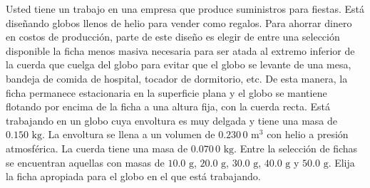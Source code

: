 \item Usted tiene un trabajo en una empresa que produce suministros para fiestas. Está diseñando globos llenos de helio para vender como regalos. Para ahorrar dinero en costos de producción, parte de este diseño es elegir de entre una selección disponible la ficha menos masiva necesaria para ser atada al extremo inferior de la cuerda que cuelga del globo para evitar que el globo se levante de una mesa, bandeja de comida de hospital, tocador de dormitorio, etc. De esta manera, la ficha permanece estacionaria en la superficie plana y el globo se mantiene flotando por encima de la ficha a una altura fija, con la cuerda recta. Está trabajando en un globo cuya envoltura es muy delgada y tiene una masa de $0.150 \text{ kg}$. La envoltura se llena a un volumen de $0.230\,0 \text{ m}^3$ con helio a presión atmosférica. La cuerda tiene una masa de $0.070\,0 \text{ kg}$. Entre la selección de fichas se encuentran aquellas con masas de $10.0 \text{ g}$, $20.0 \text{ g}$, $30.0 \text{ g}$, $40.0 \text{ g}$ y $50.0 \text{ g}$. Elija la ficha apropiada para el globo en el que está trabajando.
